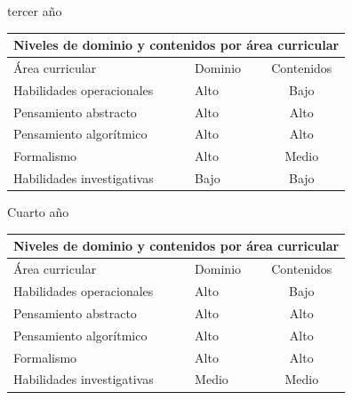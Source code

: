 tercer año

\begin{table}[H]
\begin{center}
\begin{tabular}{|ccc|}
\hline
\multicolumn{3}{|c|}{\cellcolor[HTML]{00C0F3}\textbf{Niveles de dominio y contenidos por área curricular}} \\ \hline
\multicolumn{1}{|l|}{Área curricular} & \multicolumn{1}{l|}{Dominio} & Contenidos \\ \hline
\multicolumn{1}{|l|}{Habilidades operacionales} & \multicolumn{1}{l|}{Alto} & Bajo \\ \hline
\multicolumn{1}{|l|}{Pensamiento abstracto} & \multicolumn{1}{l|}{Alto} & Alto \\ \hline
\multicolumn{1}{|l|}{Pensamiento algorítmico} & \multicolumn{1}{l|}{Alto} & Alto \\ \hline
\multicolumn{1}{|l|}{Formalismo} & \multicolumn{1}{l|}{Alto} & Medio \\ \hline
\multicolumn{1}{|l|}{Habilidades investigativas} & \multicolumn{1}{l|}{Bajo} & Bajo \\ \hline
\end{tabular}
\end{center}
\end{table}

Cuarto año


\begin{table}[H]
\begin{center}
\begin{tabular}{|ccc|}
\hline
\multicolumn{3}{|c|}{\cellcolor[HTML]{00C0F3} \textbf{Niveles de dominio y contenidos por área curricular}} \\ \hline
\multicolumn{1}{|l|}{Área curricular} & \multicolumn{1}{l|}{Dominio} & Contenidos \\ \hline
\multicolumn{1}{|l|}{Habilidades operacionales} & \multicolumn{1}{l|}{Alto} & Bajo \\ \hline
\multicolumn{1}{|l|}{Pensamiento abstracto} & \multicolumn{1}{l|}{Alto} & Alto \\ \hline
\multicolumn{1}{|l|}{Pensamiento algorítmico} & \multicolumn{1}{l|}{Alto} & Alto \\ \hline
\multicolumn{1}{|l|}{Formalismo} & \multicolumn{1}{l|}{Alto} & Alto \\ \hline
\multicolumn{1}{|l|}{Habilidades investigativas} & \multicolumn{1}{l|}{Medio} & Medio \\ \hline
\end{tabular}
\end{center}
\end{table}


